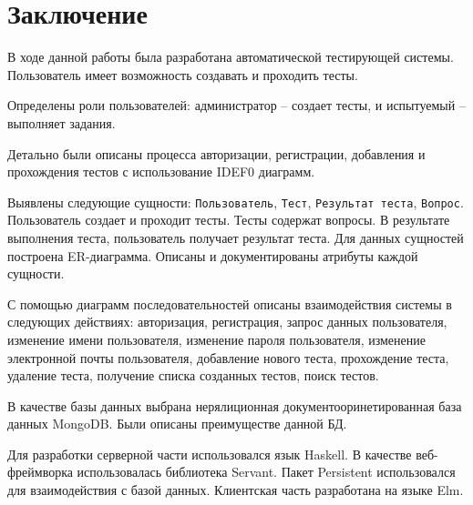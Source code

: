 \chapter{Заключение}
В ходе данной работы была разработана автоматической тестирующей системы. Пользователь имеет возможность создавать и проходить тесты.

Определены роли пользователей: администратор -- создает тесты, и испытуемый -- выполняет задания. 

Детально были описаны процесса авторизации, регистрации, добавления и прохождения тестов с использование IDEF0 диаграмм. 

Выявлены следующие сущности: \texttt{Пользователь}, \texttt{Тест}, \texttt{Результат теста}, \texttt{Вопрос}. Пользователь создает и проходит тесты. Тесты содержат вопросы. В результате выполнения теста, пользователь получает результат теста. Для данных сущностей построена ER-диаграмма. Описаны и документированы атрибуты каждой сущности.

С помощью диаграмм последовательностей описаны взаимодействия системы в следующих действиях: авторизация, регистрация, запрос данных пользователя, изменение имени пользователя, изменение пароля пользователя, изменение электронной почты пользователя, добавление нового теста, прохождение теста, удаление теста, получение списка созданных тестов, поиск тестов.

В качестве базы данных выбрана нерялиционная документооринетированная база данных MongoDB. Были описаны преимуществе данной БД.

Для разработки серверной части использовался язык Haskell. В качестве веб-фреймворка использовалась библиотека Servant. Пакет Persistent использовался для взаимодействия с базой данных. Клиентская часть разработана на языке Elm.
